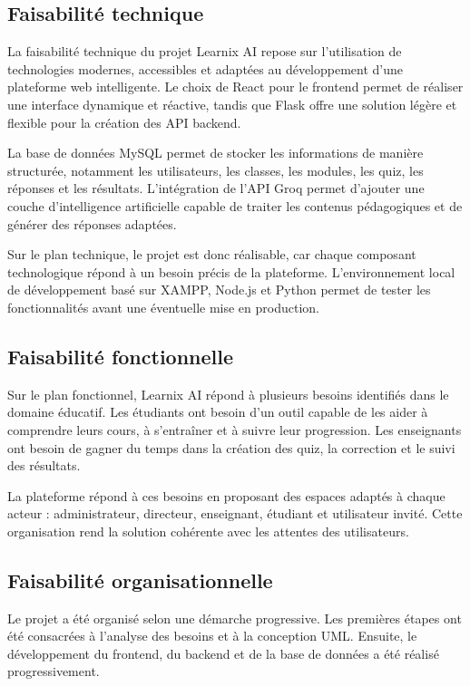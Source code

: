 \documentclass[12pt,a4paper]{report}
\begin{document}
\subsection{Faisabilité technique}

La faisabilité technique du projet Learnix AI repose sur l'utilisation de
technologies modernes, accessibles et adaptées au développement d'une plateforme
web intelligente. Le choix de React pour le frontend permet de réaliser une
interface dynamique et réactive, tandis que Flask offre une solution légère et
flexible pour la création des API backend.

La base de données MySQL permet de stocker les informations de manière
structurée, notamment les utilisateurs, les classes, les modules, les quiz, les
réponses et les résultats. L'intégration de l'API Groq permet d'ajouter une
couche d'intelligence artificielle capable de traiter les contenus pédagogiques
et de générer des réponses adaptées.

Sur le plan technique, le projet est donc réalisable, car chaque composant
technologique répond à un besoin précis de la plateforme. L'environnement local
de développement basé sur XAMPP, Node.js et Python permet de tester les
fonctionnalités avant une éventuelle mise en production.

\subsection{Faisabilité fonctionnelle}

Sur le plan fonctionnel, Learnix AI répond à plusieurs besoins identifiés dans
le domaine éducatif. Les étudiants ont besoin d'un outil capable de les aider à
comprendre leurs cours, à s'entraîner et à suivre leur progression. Les
enseignants ont besoin de gagner du temps dans la création des quiz, la
correction et le suivi des résultats.

La plateforme répond à ces besoins en proposant des espaces adaptés à chaque
acteur : administrateur, directeur, enseignant, étudiant et utilisateur invité.
Cette organisation rend la solution cohérente avec les attentes des utilisateurs.

\subsection{Faisabilité organisationnelle}

Le projet a été organisé selon une démarche progressive. Les premières étapes
ont été consacrées à l'analyse des besoins et à la conception UML. Ensuite, le
développement du frontend, du backend et de la base de données a été réalisé
progressivement.
\end{document}
